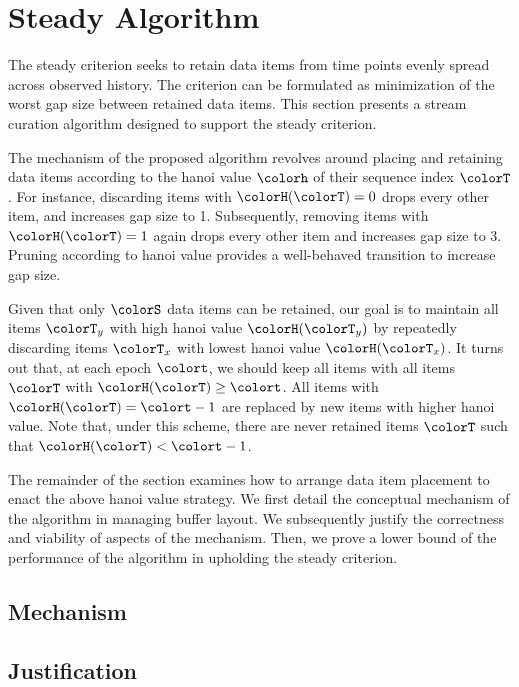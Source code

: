 \section{Steady Algorithm} \label{sec:steady}

The steady criterion seeks to retain data items from time points evenly spread across observed history.
The criterion can be formulated as minimization of the worst gap size between retained data items.
This section presents a stream curation algorithm designed to support the steady criterion.

The mechanism of the proposed algorithm revolves around placing and retaining data items according to the hanoi value $\colorh$ of their sequence index $\colorT$.
For instance, discarding items with $\colorH(\colorT) = 0$ drops every other item, and increases gap size to 1.
Subsequently, removing items with $\colorH(\colorT) = 1$ again drops every other item and increases gap size to 3.
Pruning according to hanoi value provides a well-behaved transition to increase gap size.

Given that only $\colorS$ data items can be retained, our goal is to maintain all items $\colorT_y$ with high hanoi value $\colorH(\colorT_y)$ by repeatedly discarding items $\colorT_x$ with lowest hanoi value $\colorH(\colorT_x)$.
It turns out that, at each epoch $\colort$, we should keep all items with all items $\colorT$ with $\colorH(\colorT) \geq \colort$.
All items with $\colorH(\colorT) = \colort - 1$ are replaced by new items with higher hanoi value.
Note that, under this scheme, there are never retained items $\colorT$ such that $\colorH(\colorT) < \colort - 1$.

The remainder of the section examines how to arrange data item placement to enact the above hanoi value strategy.
We first detail the conceptual mechanism of the algorithm in managing buffer layout.
We subsequently justify the correctness and viability of aspects of the mechanism.
Then, we prove a lower bound of the performance of the algorithm in upholding the steady criterion.

\subsection{Mechanism}






\subsection{Justification}

